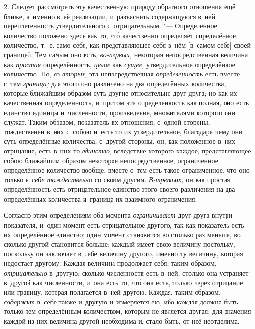 2. Следует рассмотреть эту качественную природу обратного отношения ещё ближе,
а~именно в~её реализации, и~разъяснить содержащуюся в~ней переплетенность
утвердительного с~отрицательным. "--- Определённое количество положено здесь
как то, чт\'{о} качественно определяет определённое количество, т.~е. само
себя, как представляющее себя в~нём [в~самом себе] своей границей. Тем самым
оно есть, {\em во-первых,} некоторая непосредственная величина как
{\em простая} определённость, {\em целое} как {\em сущее,} утвердительное
определённое количество. Но, {\em во-вторых,} эта непосредственная
{\em определённость} есть вместе с~тем {\em граница;} для этого оно различено
на два определённых количества, которые ближайшим образом суть другие
относительно друг друга; но как их качественная определённость, и~притом эта
определённость как полная, оно есть единство единицы и~численности,
произведение, множителями которого они служат. Таким образом, показатель их
отношения, с~одной стороны, тождественен в~них с~собою и~есть то их
утвердительное, благодаря чему они суть определённые количества; с~другой
стороны, он, как положенное в~них отрицание, есть в~них то {\em единство,}
вследствие которого каждое, представляющее собою ближайшим образом некоторое
непосредственное, ограниченное определённое количество вообще, вместе с~тем
есть такое ограниченное, что оно только {\em в~себе тождественно} со своим
другим. {\em В-третьих,} он как простая определённость есть отрицательное
единство этого своего различения на два определённых количества и~граница их
взаимного ограничения.

Согласно этим определениям оба момента {\em ограничивают} друг друга внутри
показателя, и~один момент есть отрицательное другого, так как показатель есть
их определённое единство; один момент становится во столько раз меньше, во
сколько другой становится больше; каждый имеет свою величину постольку,
поскольку он заключает в~себе величину другого, именно ту величину, которая
недостаёт другому. Каждая величина продолжает себя, таким образом,
{\em отрицательно} в~другую; сколько численности есть в~ней, столько она
устраняет в~другой как численности, и~она есть то, чт\'{о} она есть, только
через отрицание или границу, которая полагается в~ней другою. Каждая, таким
образом, {\em содержит} в~себе также и~другую и~измеряется ею, ибо каждая
должна быть только тем определённым количеством, которым не является другая;
для значения каждой из них величина другой необходима и, стало быть, от неё
неотделима.


